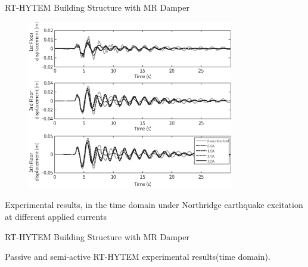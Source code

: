 \documentclass[usepdftitle=false]{beamer}
\begin{document}
\begin{frame}{RT-HYTEM Building Structure with MR Damper}
\begin{figure}[H]
\centering
\includegraphics[width=0.8\textwidth] {figure/8-17.eps}
\label{fig:8-17}
\end{figure}
Experimental results, in the time domain under Northridge earthquake excitation at different applied currents
\end{frame}

\begin{frame}{RT-HYTEM Building Structure with MR Damper}
\begin{figure}[H]
\centering
\setcounter{subfigure}{0}
\label{fig:8-20}
\end{figure}
Passive and semi-active RT-HYTEM experimental results(time domain).
\end{frame}
\end{document}
